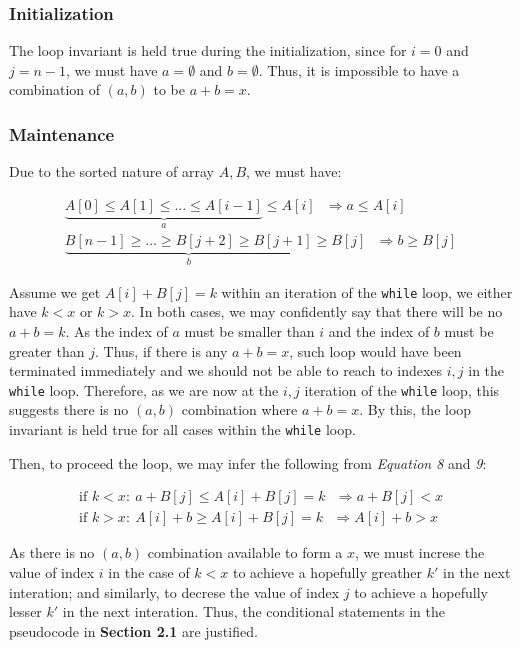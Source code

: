 \documentclass[12pt]{article}
\newcommand{\inlinecode}{\texttt}
\begin{document}
\subsubsection{Initialization}
The loop invariant is held true during the initialization, since for $i = 0$ and $j = n-1$, we must have $a = \emptyset$ and $b = \emptyset$. Thus, it is impossible to have a combination of $(a, b)$ to be $a + b = x$.

\subsubsection{Maintenance}

Due to the sorted nature of array $A, B$, we must have:

\begin{gather}
    \underbrace{A[0] \leq A[1] \leq ... \leq A[i-1]}_{a} \leq A[i]  \ \ \ \Rightarrow a \leq A[i]\\
    \underbrace{B[n-1] \geq ... \geq B[j+2] \geq B[j+1]}_{b} \geq B[j] \ \ \ \Rightarrow b \geq B[j]
\end{gather}

Assume we get $A[i] + B[j] = k$ within an iteration of the \inlinecode{while} loop, we either have $k < x$ or $k > x$. In both cases, we may confidently say that there will be no $a + b = k$. As the index of $a$ must be smaller than $i$ and the index of $b$ must be greater than $j$. Thus, if there is any $a + b = x$, such loop would have been terminated immediately and we should not be able to reach to indexes $i, j$ in the \inlinecode{while} loop. Therefore, as we are now at the $i, j$ iteration of the \inlinecode{while} loop, this suggests there is no $(a, b)$ combination where $a + b = x$. By this, the loop invariant is held true for all cases within the \inlinecode{while} loop.\newline

Then, to proceed the loop, we may infer the following from \textit{Equation 8} and \textit{9}:

\begin{gather}
    \text{if } k < x: \ a + B[j] \leq A[i] + B[j] = k  \ \ \ \Rightarrow a + B[j] < x\\
    \text{if } k > x: \ A[i] + b \geq A[i] + B[j] = k  \ \ \ \Rightarrow A[i] + b > x
\end{gather}

As there is no $(a, b)$ combination available to form a $x$, we must increse the value of index $i$ in the case of $k < x$ to achieve a hopefully greather $k'$ in the next interation; and similarly, to decrese the value of index $j$ to achieve a hopefully lesser $k'$ in the next interation. Thus, the conditional statements in the pseudocode in \textbf{Section 2.1} are justified.
\end{document}
